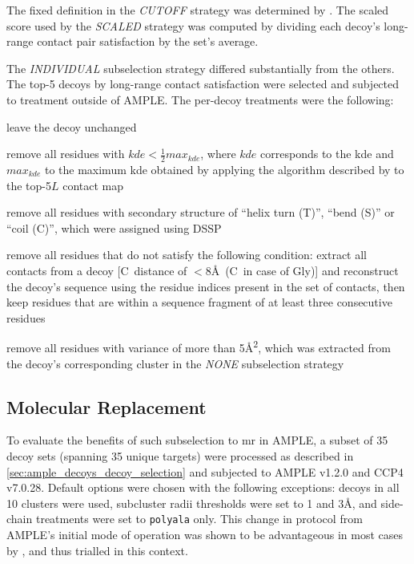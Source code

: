 The fixed definition in the \textit{CUTOFF} strategy was determined by \textcite{De_Oliveira2016-gj}. The scaled score used by the \textit{SCALED} strategy was computed by dividing each decoy's long-range contact pair satisfaction by the set's average.

The \textit{INDIVIDUAL} subselection strategy differed substantially from the others. The top-5 decoys by long-range contact satisfaction were selected and subjected to treatment outside of AMPLE. The per-decoy treatments were the following:

\begin{description}[style=multiline,leftmargin=4cm]
    \item[default] leave the decoy unchanged
    \item[domain] remove all residues with $kde<\frac{1}{2}max_{kde}$, where $kde$ corresponds to the \gls{kde} and $max_{kde}$ to the maximum \gls{kde} obtained by applying the algorithm described by \textcite{Sadowski2013-zu} to the top-5$L$ contact map
    \item[dssp] remove all residues with secondary structure of ``helix turn (T)'', ``bend (S)'' or ``coil (C)'', which were assigned using DSSP \cite{Frishman1995-si} 
    \item[fragment] remove all residues that do not satisfy the following condition: extract all contacts from a decoy [C\textbeta\ distance of $<8$\AA\ (C\textalpha\ in case of Gly)] and reconstruct the decoy's sequence using the residue indices present in the set of contacts, then keep residues that are within a sequence fragment of at least three consecutive residues
    \item[variance] remove all residues with variance of more than 5\AA\textsuperscript{2}, which was extracted from the decoy's corresponding cluster in the \textit{NONE} subselection strategy
\end{description}

\subsection{Molecular Replacement} \label{subsec:ample_decoys_methods_mr}
To evaluate the benefits of such subselection to \gls{mr} in AMPLE, a subset of 35 decoy sets (spanning 35 unique targets) were processed as described in \cref{sec:ample_decoys_decoy_selection} and subjected to AMPLE v1.2.0 and CCP4 v7.0.28. Default options were chosen with the following exceptions: decoys in all 10 clusters were used, subcluster radii thresholds were set to 1 and 3\AA, and side-chain treatments were set to \texttt{polyala} only. This change in protocol from AMPLE's initial mode of operation \cite{Bibby2012-lm} was shown to be advantageous in most cases by \textcite{Thomas2017-qu}, and thus trialled in this context. 

